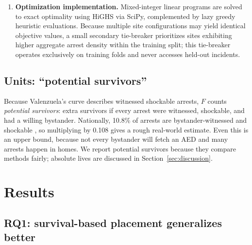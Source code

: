 \documentclass[11pt]{article}
\begin{document}
\begin{enumerate}
\item \textbf{Optimization implementation.} Mixed-integer linear programs are solved to exact optimality using HiGHS via SciPy, complemented by lazy greedy heuristic evaluations. Because multiple site configurations may yield identical objective values, a small secondary tie-breaker prioritizes sites exhibiting higher aggregate arrest density within the training split; this tie-breaker operates exclusively on training folds and never accesses held-out incidents.
\end{enumerate}

\subsection{Units: ``potential survivors''}
Because Valenzuela's curve describes witnessed shockable arrests, $F$ counts \emph{potential survivors}: extra survivors if every arrest were witnessed, shockable, and had a willing bystander. Nationally, 10.8\% of arrests are bystander-witnessed and shockable \cite{caresall}, so multiplying by 0.108 gives a rough real-world estimate. Even this is an upper bound, because not every bystander will fetch an AED and many arrests happen in homes. We report potential survivors because they compare methods fairly; absolute lives are discussed in Section~\ref{sec:discussion}.

\section{Results}

\subsection{RQ1: survival-based placement generalizes better}
\end{document}
